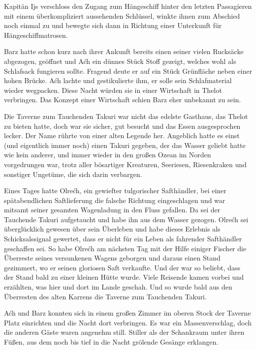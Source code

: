 \trennzeichen



Kapitän Ijs verschloss den Zugang zum Hängeschiff hinter den letzten Passagieren mit einem überkompliziert aussehenden Schlüssel, winkte ihnen zum Abschied noch einmal zu und bewegte sich dann in Richtung einer Unterkunft für Hängeschiffmatrosen.

Barz hatte schon kurz nach ihrer Ankunft bereits einen seiner vielen Rucksäcke abgezogen, geöffnet und Aćh ein dünnes Stück Stoff gezeigt, welches wohl als Schlafsack fungieren sollte. Fragend deute er auf ein Stück Grünfläche neben einer hohen Brücke. Aćh lachte und gestikulierte ihm, er solle sein Schlafmaterial wieder wegpacken. Diese Nacht würden sie in einer Wirtschaft in Thelot verbringen. Das Konzept einer Wirtschaft schien Barz eher unbekannt zu sein.

Die Taverne zum Tauchenden Takuri war nicht das edelste Gasthaus, das Thelot zu bieten hatte, doch war sie sicher, gut besucht und das Essen ausgesprochen lecker. Der Name rührte von einer alten Legende her. Angeblich hatte es einst (und eigentlich immer noch) einen Takuri gegeben, der das Wasser geliebt hatte wie kein anderer, und immer wieder in den großen Ozean im Norden vorgedrungen war, trotz aller bösartiger Kreaturen, Seeriesen, Riesenkraken und sonstiger Ungetüme, die sich darin verbargen.

Eines Tages hatte Olrećh, ein gewiefter tulgorischer Safthändler, bei einer spätabendlichen Saftlieferung die falsche Richtung eingeschlagen und war mitsamt seiner gesamten Wagenladung in den Fluss gefallen. Da sei der Tauchende Takuri aufgetaucht und habe ihn aus dem Wasser gezogen. Olrećh sei überglücklich gewesen über sein Überleben und habe dieses Erlebnis als Schicksalssignal gewertet, dass er nicht für ein Leben als fahrender Safthändler geschaffen sei. So habe Olrećh am nächsten Tag mit der Hilfe einiger Fischer die Überreste seines versunkenen Wagens geborgen und daraus einen Stand gezimmert, wo er seinen gloriosen Saft verkaufte. Und der war so beliebt, dass der Stand bald zu einer kleinen Hütte wurde. Viele Reisende kamen vorbei und erzählten, was hier und dort im Lande geschah. Und so wurde bald aus den Überresten des alten Karrens die Taverne zum Tauchenden Takuri.



\trennzeichen



Aćh und Barz konnten sich in einem großen Zimmer im oberen Stock der Taverne Platz einrichten und die Nacht dort verbringen. Es war ein Massenverschlag, doch die anderen Gäste waren angenehm still. Stiller als der Schankraum unter ihren Füßen, aus dem noch bis tief in die Nacht grölende Gesänge erklangen.

